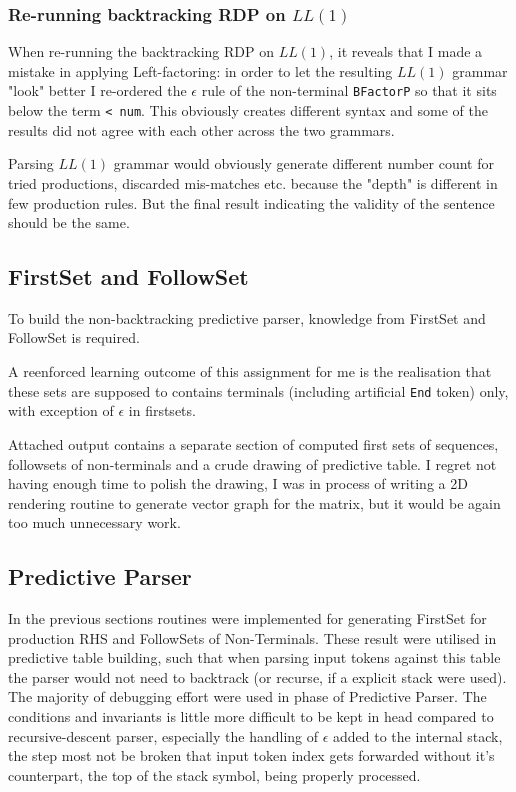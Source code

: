 \documentclass[%
 aip,
 jmp,%
 amsmath,amssymb,
 reprint,%
]{revtex4-1}
\begin{document}
\subsubsection{Re-running backtracking RDP on $LL(1)$}

When re-running the backtracking RDP on $LL(1)$, it reveals that I made a mistake in applying Left-factoring: in order to let the resulting $LL(1)$ grammar "look" better I re-ordered the $\epsilon$ rule of the non-terminal \texttt{BFactorP} so that it sits below the term \texttt{< num}. This obviously creates different syntax and some of the results did not agree with each other across the two grammars. 

Parsing $LL(1)$ grammar would obviously generate different number count for tried productions, discarded mis-matches etc. because the "depth" is different in few production rules. But the final result indicating the validity of the sentence should be the same.

\subsection{FirstSet and FollowSet}
To build the non-backtracking predictive parser, knowledge from FirstSet and FollowSet is required.

A reenforced learning outcome of this assignment for me is the realisation that these sets are supposed to contains terminals (including artificial \texttt{End} token) only, with exception of $\epsilon$ in firstsets.

Attached output contains a separate section of computed first sets of sequences, followsets of non-terminals and a crude drawing of predictive table. I regret not having enough time to polish the drawing, I was in process of writing a 2D rendering routine to generate vector graph for the matrix, but it would be again too much unnecessary work.
\subsection{Predictive Parser}
In the previous sections routines were implemented for generating FirstSet for production RHS and FollowSets of Non-Terminals. These result were utilised in predictive table building, such that when parsing input tokens against this table the parser would not need to backtrack (or recurse, if a explicit stack were used). The majority of debugging effort were used in phase of Predictive Parser. The conditions and invariants is little more difficult to be kept in head compared to recursive-descent parser, especially the handling of $\epsilon$ added to the internal stack, the step most not be broken that input token index gets forwarded without it's counterpart, the top of the stack symbol, being properly processed. 
\end{document}
